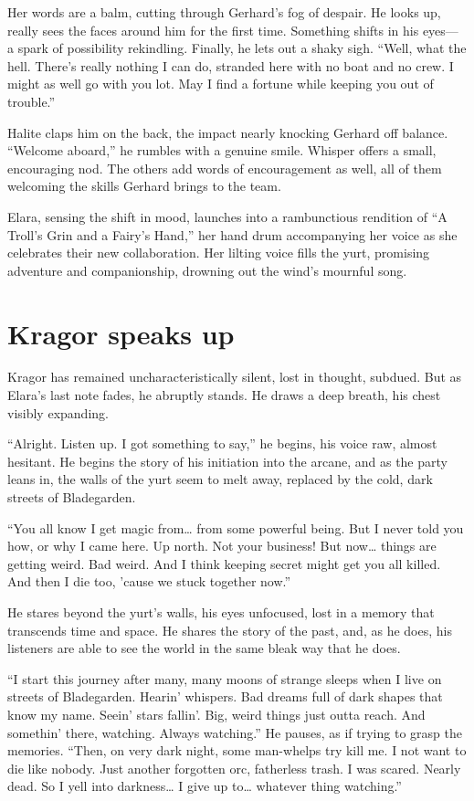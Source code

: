 \documentclass[
  letterpaper,12pt,twoside,twocolumn,openany,
  nodeprecatedcode,bg=full]{dndbook}
\begin{document}
Her words are a balm, cutting through Gerhard's fog of despair. He looks
up, really sees the faces around him for the first time. Something
shifts in his eyes--- a spark of possibility rekindling. Finally, he
lets out a shaky sigh. ``Well, what the hell. There's really nothing I
can do, stranded here with no boat and no crew. I might as well go with
you lot. May I find a fortune while keeping you out of trouble.''

Halite claps him on the back, the impact nearly knocking Gerhard off
balance. ``Welcome aboard,'' he rumbles with a genuine smile. Whisper
offers a small, encouraging nod. The others add words of encouragement
as well, all of them welcoming the skills Gerhard brings to the team.

Elara, sensing the shift in mood, launches into a rambunctious rendition
of ``A Troll's Grin and a Fairy's Hand,'' her hand drum accompanying her
voice as she celebrates their new collaboration. Her lilting voice fills
the yurt, promising adventure and companionship, drowning out the wind's
mournful song.

\section{Kragor speaks up}\label{kragor-speaks-up}

Kragor has remained uncharacteristically silent, lost in thought,
subdued. But as Elara's last note fades, he abruptly stands. He draws a
deep breath, his chest visibly expanding.

``Alright. Listen up. I got something to say,'' he begins, his voice
raw, almost hesitant. He begins the story of his initiation into the
arcane, and as the party leans in, the walls of the yurt seem to melt
away, replaced by the cold, dark streets of Bladegarden.

``You all know I get magic from\ldots{} from some powerful being. But I
never told you how, or why I came here. Up north. Not your business! But
now\ldots{} things are getting weird. Bad weird. And I think keeping
secret might get you all killed. And then I die too, 'cause we stuck
together now.''

He stares beyond the yurt's walls, his eyes unfocused, lost in a memory
that transcends time and space. He shares the story of the past, and, as
he does, his listeners are able to see the world in the same bleak way
that he does.

``I start this journey after many, many moons of strange sleeps when I
live on streets of Bladegarden. Hearin' whispers. Bad dreams full of
dark shapes that know my name. Seein' stars fallin'. Big, weird things
just outta reach. And somethin' there, watching. Always watching.'' He
pauses, as if trying to grasp the memories. ``Then, on very dark night,
some man-whelps try kill me. I not want to die like nobody. Just another
forgotten orc, fatherless trash. I was scared. Nearly dead. So I yell
into darkness\ldots{} I give up to\ldots{} whatever thing watching.''
\end{document}
